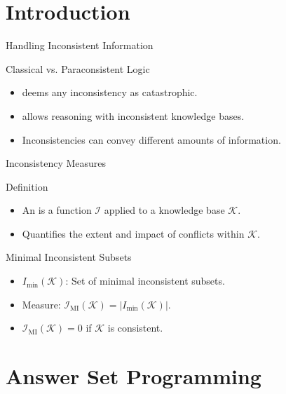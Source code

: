 \section{Introduction}

\begin{frame}{Handling Inconsistent Information}
    \begin{block}{Classical vs. Paraconsistent Logic}
        \begin{itemize}
            \item {} deems any inconsistency as catastrophic.
            \item {} allows reasoning with inconsistent knowledge bases.
            \item Inconsistencies can convey different amounts of information.
        \end{itemize}
    \end{block}
\end{frame}

\begin{frame}{Inconsistency Measures}
    \begin{block}{Definition}
        \begin{itemize}
            \item An  is a function $\mathcal{I}$ applied to a knowledge base $\mathcal{K}$.
            \item Quantifies the extent and impact of conflicts within $\mathcal{K}$.
        \end{itemize}
    \end{block}
    \begin{block}{Minimal Inconsistent Subsets}
        \begin{itemize}
            \item $I_{\min}(\mathcal{K})$: Set of minimal inconsistent subsets.
            \item Measure: $\mathcal{I}_{\text{MI}}(\mathcal{K}) = \left| I_{\min}(\mathcal{K}) \right|$.
            \item $\mathcal{I}_{\text{MI}}(\mathcal{K}) = 0$ if $\mathcal{K}$ is consistent.
        \end{itemize}
    \end{block}
\end{frame}

\section{Answer Set Programming}

